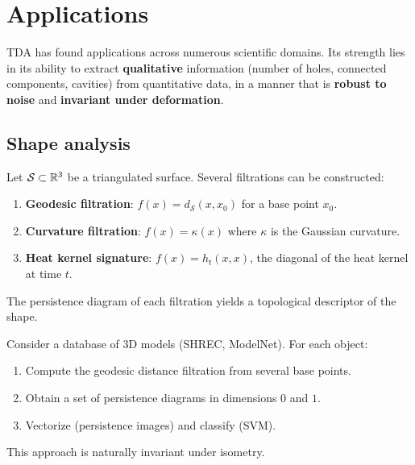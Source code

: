 \chapter{Applications}
\label{ch:applications}

\begin{intuition}
TDA has found applications across numerous scientific domains.
Its strength lies in its ability to extract \textbf{qualitative}
information (number of holes, connected components, cavities)
from quantitative data, in a manner that is \textbf{robust to noise}
and \textbf{invariant under deformation}.
\end{intuition}

\section{Shape analysis}
\label{sec:shapes}

\begin{definition}
Let $\mathcal{S} \subset \mathbb{R}^3$ be a triangulated surface. Several
filtrations can be constructed:
\begin{enumerate}
  \item \textbf{Geodesic filtration}: $f(x) = d_{\mathcal{S}}(x, x_0)$
        for a base point $x_0$.
  \item \textbf{Curvature filtration}: $f(x) = \kappa(x)$ where
        $\kappa$ is the Gaussian curvature.
  \item \textbf{Heat kernel signature}: $f(x) = h_t(x, x)$, the
        diagonal of the heat kernel at time $t$.
\end{enumerate}
The persistence diagram of each filtration yields a topological
descriptor of the shape.
\end{definition}

\begin{example}
Consider a database of 3D models (SHREC, ModelNet). For each object:
\begin{enumerate}
  \item Compute the geodesic distance filtration from several base
        points.
  \item Obtain a set of persistence diagrams in dimensions $0$
        and $1$.
  \item Vectorize (persistence images) and classify (SVM).
\end{enumerate}
This approach is naturally invariant under isometry.
\end{example}

